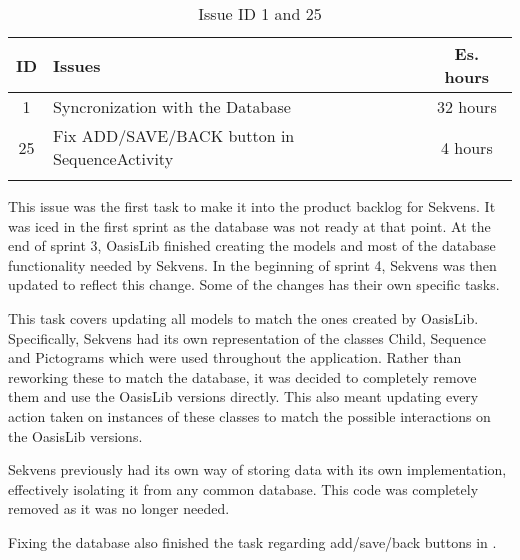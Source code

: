 \begin{longtable} { | c | p{12cm} | c | } 
\hline
	ID 	&	Issues	&		 Es. hours \\\hline
	1	&	Syncronization with the Database	&	32 hours	\\\hline
	25	&	Fix ADD/SAVE/BACK button in SequenceActivity	&	4 hours	\\\hline
\caption{Issue ID 1 and 25}
\label{tab:spr4_syncwithdatabase}
\end{longtable}

This issue was the first task to make it into the product backlog for Sekvens. It was iced in the first sprint as the database was not ready at that point. At the end of sprint 3, OasisLib finished creating the models and most of the database functionality needed by Sekvens. In the beginning of sprint 4, Sekvens was then updated to reflect this change. Some of the changes has their own specific tasks.

This task covers updating all models to match the ones created by OasisLib. Specifically, Sekvens had its own representation of the classes Child, Sequence and Pictograms which were used throughout the application. Rather than reworking these to match the database, it was decided to completely remove them and use the OasisLib versions directly. This also meant updating every action taken on instances of these classes to match the possible interactions on the OasisLib versions.

Sekvens previously had its own way of storing data with its own implementation, effectively isolating it from any common database. This code was completely removed as it was no longer needed.

Fixing the database also finished the task regarding add/save/back buttons in .